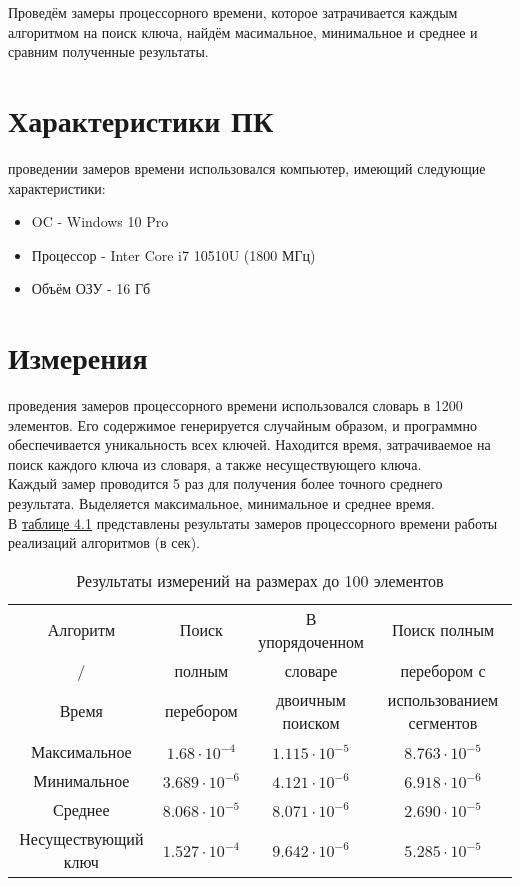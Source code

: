 Проведём замеры процессорного времени, которое затрачивается каждым алгоритмом на поиск ключа, найдём масимальное, минимальное и среднее и сравним полученные результаты.

\section{Характеристики ПК}
 проведении замеров времени использовался компьютер, имеющий следующие характеристики:
\begin{itemize}
	\item OC - Windows 10 Pro
	\item Процессор - Inter Core i7 10510U (1800 МГц)
	\item Объём ОЗУ - 16 Гб
\end{itemize}

\section{Измерения}
 проведения замеров процессорного времени использовался словарь в 1200 элементов. Его содержимое генерируется случайным образом, и программно обеспечивается уникальность всех ключей. Находится время, затрачиваемое на поиск каждого ключа из словаря, а также несуществующего ключа. \\

Каждый замер проводится 5 раз для получения более точного среднего результата. Выделяется максимальное, минимальное и среднее время.\\

В \hyperref[table_4_1]{таблице 4.1} представлены результаты замеров процессорного времени работы реализаций алгоритмов (в сек).

\begin{table}[ph] \label{table_4_1}
	\caption{Результаты измерений на размерах до 100 элементов}
	\centering
	\begin{tabular}{|c|c|c|c|}
		\hline
		Алгоритм &Поиск & В упорядоченном & Поиск полным\\
		/    &полным &словаре &перебором с\\
		Время    &перебором &двоичным поиском &использованием сегментов \\
		\hline
		Максимальное & $1.68\cdot10^{-4}$ & $1.115\cdot10^{-5}$ & $8.763\cdot10^{-5}$ \\
		\hline
		Минимальное & $3.689\cdot10^{-6}$ & $4.121\cdot10^{-6}$ & $6.918\cdot10^{-6}$ \\
		\hline
		Среднее & $8.068\cdot10^{-5}$ & $8.071\cdot10^{-6}$ & $2.690\cdot10^{-5}$ \\
		\hline
		Несуществующий ключ & $1.527\cdot10^{-4}$ & $9.642\cdot10^{-6}$ & $5.285\cdot10^{-5}$ \\
		\hline
	\end{tabular}
\end{table}

